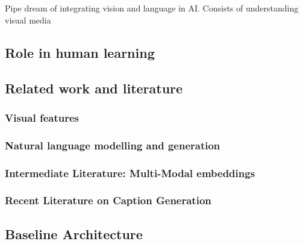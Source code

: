 \chapter{} \label{chapter:background} 

Pipe dream of integrating vision and language in AI.  Consists of understanding
visual media 
\section{Role in human learning}
\section{Related work and literature}
\subsection{Visual features}
\subsection{Natural language modelling and generation}
\subsection{Intermediate Literature: Multi-Modal embeddings}
\subsection{Recent Literature on Caption Generation}
\section{Baseline Architecture}
